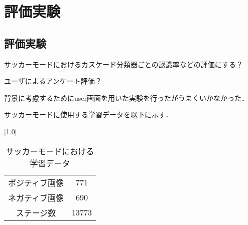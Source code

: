\chapter{評価実験}
\thispagestyle{fancy}


\section{評価実験}
サッカーモードにおけるカスケード分類器ごとの認識率などの評価にする？

ユーザによるアンケート評価？

背景に考慮するためにuser画面を用いた実験を行ったがうまくいかなかった．


サッカーモードに使用する学習データを以下に示す．

\begin{table}[h]
    \centering
    \scalebox{1.0}[1.0]{
     \begin{tabular}{cc}	\hline
       ポジティブ画像 & 771  \\    
       ネガティブ画像 & 690  \\
       ステージ数 & 13773  \\ \hline
     \end{tabular}
    } 
    \caption{サッカーモードにおける学習データ}
    \label{soccerstudy}
\end{table}
